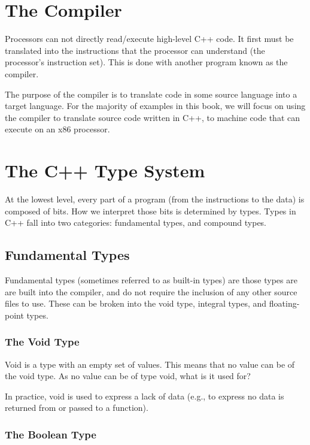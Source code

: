 \documentclass[11pt,fancy,authoryear]{elegantbook}
\begin{document}
\section{The Compiler}

Processors can not directly read/execute high-level C++ code. It first must be translated into the instructions that the processor can understand (the processor's instruction set). This is done with another program known as the compiler.

The purpose of the compiler is to translate code in some source language into a target language. For the majority of examples in this book, we will focus on using the compiler to translate source code written in C++, to machine code that can execute on an x86 processor.

\section{The C++ Type System}

At the lowest level, every part of a program (from the instructions to the data) is composed of bits. How we interpret those bits is determined by types. Types in C++ fall into two categories: fundamental types, and compound types.

\subsection{Fundamental Types}

Fundamental types (sometimes referred to as built-in types) are those types are are built into the compiler, and do not require the inclusion of any other source files to use. These can be broken into the void type, integral types, and floating-point types.

\subsubsection{The Void Type}

Void is a type with an empty set of values. This means that no value can be of the void type. As no value can be of type void, what is it used for? 

In practice, void is used to express a lack of data (e.g., to express no data is returned from or passed to a function).

\subsubsection{The Boolean Type}
\end{document}
